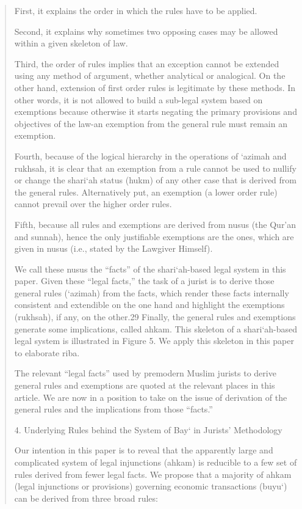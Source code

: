 \begin{quote}
First, it explains the order in which the rules have to be applied.

Second, it explains why sometimes two opposing cases may be allowed within a given skeleton of law.

Third, the order of rules implies that an exception cannot be extended using any method of argument, whether analytical or analogical. On the other hand, extension of first order rules is legitimate by these methods. In other words, it is not allowed to build a sub-legal system based on exemptions because otherwise it starts negating the primary provisions and objectives of the law-an exemption from the general rule must remain an exemption.

Fourth, because of the logical hierarchy in the operations of ‘azimah and rukhsah, it is clear that an exemption from a rule cannot be used to nullify or change the shari‘ah status (hukm) of any other case that is derived from the general rules. Alternatively put, an exemption (a lower order rule) cannot prevail over the higher order rules.

Fifth, because all rules and exemptions are derived from nusus (the Qur'an and sunnah), hence the only justifiable exemptions are the ones, which are given in nusus (i.e., stated by the Lawgiver Himself).

We call these nusus the “facts” of the shari‘ah-based legal system in this paper. Given these “legal facts,” the task of a jurist is to derive those general rules (‘azimah) from the facts, which render these facts internally consistent and extendible on the one hand and highlight the exemptions (rukhsah), if any, on the other.29 Finally, the general rules and exemptions generate some implications, called ahkam. This skeleton of a shari‘ah-based legal system is illustrated in Figure 5. We apply this skeleton in this paper to elaborate riba.

The relevant “legal facts” used by premodern Muslim jurists to derive general rules and exemptions are quoted at the relevant places in this article. We are now in a position to take on the issue of derivation of the general rules and the implications from those “facts.”

4. Underlying Rules behind the System of Bay‘ in Jurists' Methodology

Our intention in this paper is to reveal that the apparently large and complicated system of legal injunctions (ahkam) is reducible to a few set of rules derived from fewer legal facts. We propose that a majority of ahkam (legal injunctions or provisions) governing economic transactions (buyu‘) can be derived from three broad rules:


\end{quote}
